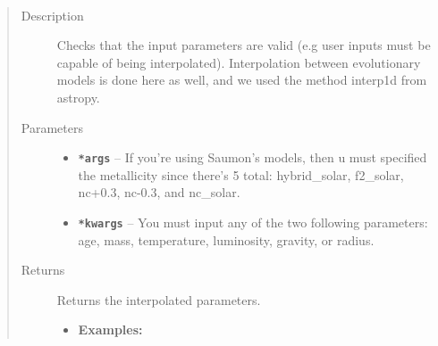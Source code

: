 \documentclass[letterpaper,10pt,english]{sphinxmanual}
\begin{document}

\begin{fulllineitems}
\label{bdevopar:bdevopar.Params}~\begin{quote}\begin{description}
\item[{Description}] \leavevmode
Checks that the input parameters are valid (e.g user
inputs must be capable of being interpolated).
Interpolation between evolutionary models is done here
as well, and we used the method interp1d from astropy.

\item[{Parameters}] \leavevmode\begin{itemize}
\item {} 
\textbf{\texttt{*args}} -- 
If you're using Saumon's models, then u must specified the
metallicity since there's 5 total: hybrid\_solar, f2\_solar,
nc+0.3, nc-0.3, and nc\_solar.


\item {} 
\textbf{\texttt{*kwargs}} -- 
You must input any of the two following parameters: age,
mass, temperature, luminosity, gravity, or radius.


\end{itemize}

\item[{Returns}] \leavevmode

Returns the interpolated parameters.
\begin{itemize}
\item {} 
\textbf{Examples:}


\end{itemize}
\end{description}
\end{quote}
\end{fulllineitems}
\end{document}
